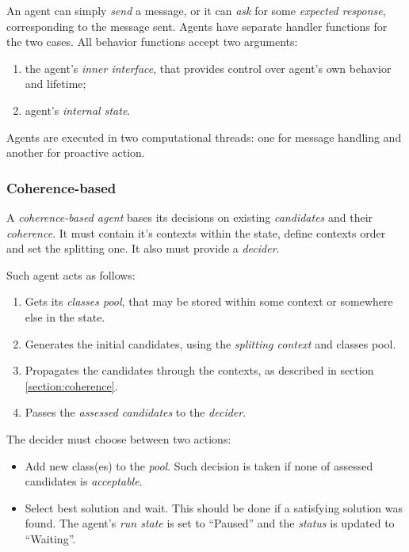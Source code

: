 An agent can simply \emph{send} a message, or it can \emph{ask} for some
\emph{expected response}, corresponding to the message sent. Agents have
separate handler functions for the two cases. All behavior functions
accept two arguments:
\begin{enumerate}
\item the agent's \emph{inner interface}, that provides
  control over agent's own behavior and lifetime;
\item agent's \emph{internal state}.
\end{enumerate}
 
Agents are executed in two computational threads: one for message handling
and another for proactive action.

\subsubsection{Coherence-based}

A \emph{coherence-based agent} bases its decisions on existing \emph{candidates}
and their \emph{coherence}. It must contain it's contexts within the state,
define contexts order and set the splitting one. It also must provide a
\emph{decider}.
\medskip

\noindent
Such agent acts as follows:
\begin{enumerate}
\item Gets its \emph{classes pool}, that may be stored within some context or
  somewhere else in the state.
\item Generates the initial candidates, using the \emph{splitting context} and
  classes pool.
\item Propagates the candidates through the contexts, as described in section
  \ref{section:coherence}.
\item Passes the \emph{assessed candidates} to the \emph{decider}.
\end{enumerate}

The decider must choose between two actions:
\begin{itemize}
\item Add new class(es) to the \emph{pool}. Such decision is taken if
  none of assessed candidates is \emph{acceptable}.
\item Select best solution and wait. This should be done if a satisfying
  solution was found. The agent's \emph{run state} is set to ``Paused'' and
  the \emph{status} is updated to ``Waiting''.
\end{itemize}

